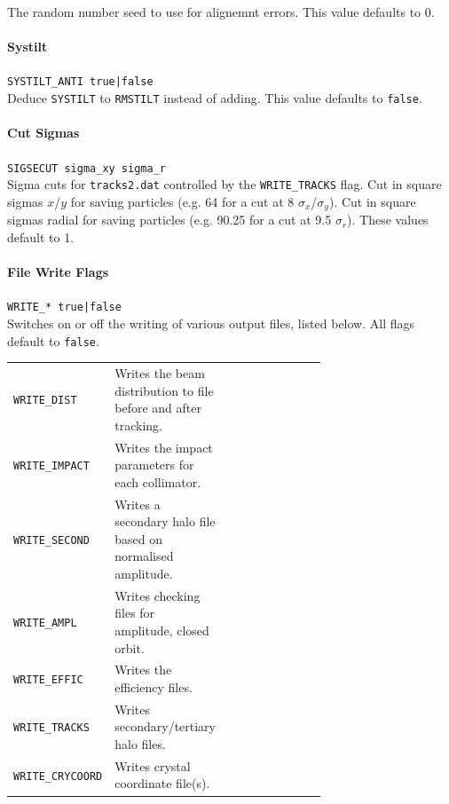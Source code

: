 The random number seed to use for alignemnt errors.
This value defaults to 0.

\paragraph{Systilt} \texttt{SYSTILT\_ANTI true|false}\\

Deduce \texttt{SYSTILT} to \texttt{RMSTILT} instead of adding.
This value defaults to \texttt{false}.

\paragraph{Cut Sigmas} \texttt{SIGSECUT sigma\_xy sigma\_r}\\

Sigma cuts for \texttt{tracks2.dat} controlled by the \texttt{WRITE\_TRACKS} flag.
Cut in square sigmas $x$/$y$ for saving particles (e.g. 64 for a cut at 8 $\sigma_x$/$\sigma_y$).
Cut in square sigmas radial for saving particles (e.g. 90.25 for a cut at 9.5 $\sigma_r$).
These values default to 1.

\paragraph{File Write Flags} \texttt{WRITE\_* true|false}\\

Switches on or off the writing of various output files, listed below.
All flags default to \texttt{false}.

\bigskip
\begin{tabular}{@{}llp{0.7\linewidth}}
    \texttt{WRITE\_DIST}     & Writes the beam distribution to file before and after tracking. \\
    \texttt{WRITE\_IMPACT}   & Writes the impact parameters for each collimator. \\
    \texttt{WRITE\_SECOND}   & Writes a secondary halo file based on normalised amplitude. \\
    \texttt{WRITE\_AMPL}     & Writes checking files for amplitude, closed orbit. \\
    \texttt{WRITE\_EFFIC}    & Writes the efficiency files. \\
    \texttt{WRITE\_TRACKS}   & Writes secondary/tertiary halo files. \\
    \texttt{WRITE\_CRYCOORD} & Writes crystal coordinate file(s).
\end{tabular}

